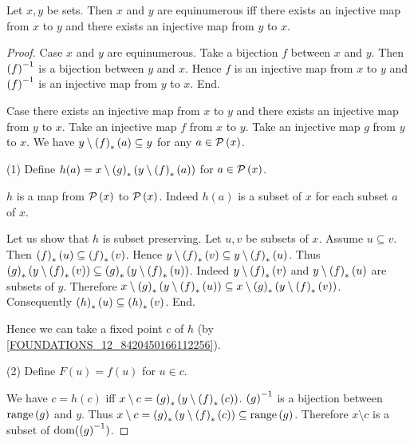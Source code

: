 \documentclass[../../set-theory/set-theory.tex]{subfiles}
\begin{document}
  \begin{forthel}
    \begin{theorem}
      Let $x, y$ be sets.
      Then $x$ and $y$ are equinumerous iff there exists an injective map from
      $x$ to $y$ and there exists an injective map from $y$ to $x$.
    \end{theorem}
    \begin{proof}
      Case $x$ and $y$ are equinumerous.
        Take a bijection $f$ between $x$ and $y$.
        Then $\left(f\right)^{-1}$ is a bijection between $y$ and $x$.
        Hence $f$ is an injective map from $x$ to $y$ and $\left(f\right)^{-1}$ is an
        injective map from $y$ to $x$.
      End.

      Case there exists an injective map from $x$ to $y$ and there exists an
      injective map from $y$ to $x$.
        Take an injective map $f$ from $x$ to $y$.
        Take an injective map $g$ from $y$ to $x$.
        We have $y \setminus \left(f\right)_{*}(a) \subseteq y$ for any $a \in \mathcal{P}\left(x\right)$.

        (1) Define $h(a) = x \setminus \left(g\right)_{*}(y \setminus \left(f\right)_{*}(a))$ for $a \in \mathcal{P}\left(x\right)$.

        $h$ is a map from $\mathcal{P}\left(x\right)$ to $\mathcal{P}\left(x\right)$.
        Indeed $h(a)$ is a subset of $x$ for each subset $a$ of $x$.

        Let us show that $h$ is subset preserving.
          Let $u, v$ be subsets of $x$.
          Assume $u \subseteq v$.
          Then $\left(f\right)_{*}(u) \subseteq \left(f\right)_{*}(v)$.
          Hence $y \setminus \left(f\right)_{*}(v) \subseteq y \setminus \left(f\right)_{*}(u)$.
          Thus $\left(g\right)_{*}(y \setminus \left(f\right)_{*}(v)) \subseteq \left(g\right)_{*}(y \setminus \left(f\right)_{*}(u))$.
          Indeed $y \setminus \left(f\right)_{*}(v)$ and $y \setminus \left(f\right)_{*}(u)$ are subsets of $y$.
          Therefore $x \setminus \left(g\right)_{*}(y \setminus \left(f\right)_{*}(u)) \subseteq
          x \setminus \left(g\right)_{*}(y \setminus \left(f\right)_{*}(v))$.
          Consequently $\left(h\right)_{*}(u) \subseteq \left(h\right)_{*}(v)$.
        End.

        Hence we can take a fixed point $c$ of $h$ (by
        \cref{FOUNDATIONS_12_8420450166112256}).

        (2) Define $F(u) = f(u)$ for $u \in c$.

        We have $c = h(c)$ iff $x \setminus c = \left(g\right)_{*}(y \setminus \left(f\right)_{*}(c))$.
        $\left(g\right)^{-1}$ is a bijection between $\mathrm{range}\left(g\right)$ and $y$.
        Thus $x \setminus c = \left(g\right)_{*}(y \setminus \left(f\right)_{*}(c)) \subseteq \mathrm{range}\left(g\right)$.
        Therefore $x \setminus c$ is a subset of $\operatorname{dom}(\left(g\right)^{-1})$.


\end{proof}
\end{forthel}
\end{document}
